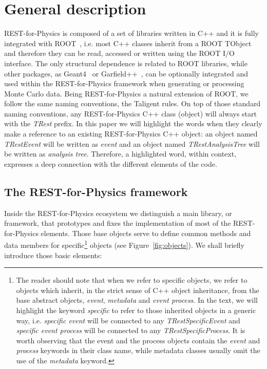 \section{General description}
\label{sec:framework}

REST-for-Physics is composed of a set of libraries written in C++ and it is fully integrated with ROOT~\cite{ROOT,Brun:2011Gp,ROOT2011}, i.e. most C++ classes inherit from a ROOT TObject and therefore they can be read, accessed or written using the ROOT I/O interface. The only structural dependence is related to ROOT libraries, while other packages, as Geant4~\cite{Agostinelli:2002hh} or Garfield++~\cite{Garfield}, can be optionally integrated and used within the REST-for-Physics framework when generating or processing Monte Carlo data. Being REST-for-Physics a natural extension of ROOT, we follow the same naming conventions, the Taligent rules. On top of those standard naming conventions, any REST-for-Physics C++ class (object) will always start with the \emph{TRest} prefix. In this paper we will highlight the words when they clearly make a reference to an existing REST-for-Physics C++ object: an object named \emph{TRestEvent} will be written as \emph{event} and an object named \emph{TRestAnalysisTree} will be written as \emph{analysis tree}. Therefore, a highlighted word, within context, expresses a deep connection with the different elements of the code.

\subsection{The REST-for-Physics framework}
Inside the REST-for-Physics ecosystem we distinguish a main library, or framework, that prototypes and fixes the implementation of most of the REST-for-Physics elements. Those base objects serve to define common methods and data members for specific\footnote{The reader should note that when we refer to specific objects, we refer to objects which inherit, in the strict sense of C++ object inheritance, from the base abstract objects, \emph{event}, \emph{metadata} and \emph{event process}. In the text, we will highlight the keyword \emph{specific} to refer to those inherited objects in a generic way, i.e. \emph{specific event} will be connected to any \emph{TRestSpecificEvent} and \emph{specific event process} will be connected to any \emph{TRestSpecificProcess}. It is worth observing that the event and the process objects contain the \emph{event} and \emph{process} keywords in their class name, while metadata classes usually omit the use of the \emph{metadata} keyword. } objects (see Figure~\ref{fig:objects}). We shall briefly introduce those basic elements:

